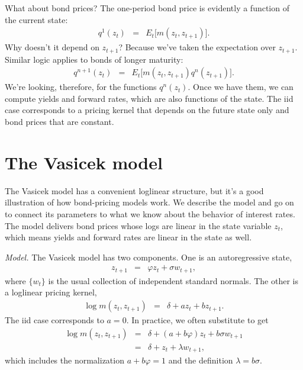 \documentclass[11pt]{article}
\begin{document}
What about bond prices?
The one-period bond price is evidently a function of the current state:
\begin{eqnarray*}
    q^1 (z_t) &=& E_t \big[ m(z_t, z_{t+1}) \big] .
\end{eqnarray*}
Why doesn't it depend on $z_{t+1}$?  Because we've taken the expectation
over $z_{t+1}$.
Similar logic applies to bonds of longer maturity:
\begin{eqnarray*}
    q^{n+1} (z_t) &=& E_t \big[ m(z_t, z_{t+1}) q^{n} (z_{t+1}) \big] .
\end{eqnarray*}
We're looking, therefore, for the functions $q^n(z_t)$.
Once we have them, we can compute yields and forward rates, which are also
functions of the state.
The iid case corresponds to a pricing kernel that depends on the future state only
and bond prices that are constant.


\section{The Vasicek model}

\begin{comment}
In the previous section, we found bond prices and forward rates
from the pricing kernel.
Here we do that, but we also do the reverse:
We use what we know about forward rates
to estimate the parameters of the pricing kernel.
So what do we know?
We have both time-series and cross-section information.
Time-series information includes the autocorrelations
of interest rates.
Cross-section information includes the mean forward rate curve:
that long rates are on average greater than short rates.
These seem like basic features of interest rates that
we would like any reasonable model to reproduce.
\end{comment}


The Vasicek model has a convenient loglinear structure,
but it's a good illustration of how bond-pricing models work.
We describe the model and go on to connect its
parameters to what we know about the behavior of interest rates.
The model delivers bond prices whose logs are linear in the state variable $z_t$,
which means yields and forward rates are linear in the state as well.


{\it Model.\/}
The Vasicek model has two components.
One is an autoregressive state,
\begin{eqnarray*}
    z_{t+1} &=& \varphi z_t + \sigma w_{t+1} ,
\end{eqnarray*}
where $\{ w_t \}$ is the usual collection of independent
standard normals.
The other is a loglinear pricing kernel,
\begin{eqnarray*}
    \log m(z_t, z_{t+1})  &=& \delta + a z_t + b z_{t+1} .
\end{eqnarray*}
The iid case corresponds to $a = 0$.
%
In practice, we often substitute to get
\begin{eqnarray*}
    \log m(z_t, z_{t+1})  &=& \delta + (a+b\varphi) z_t + b\sigma w_{t+1} \\
        &=& \delta + z_t + \lambda w_{t+1} ,
\end{eqnarray*}
which includes the normalization $a + b \varphi = 1$ and the definition
$\lambda = b \sigma$.
\end{document}

